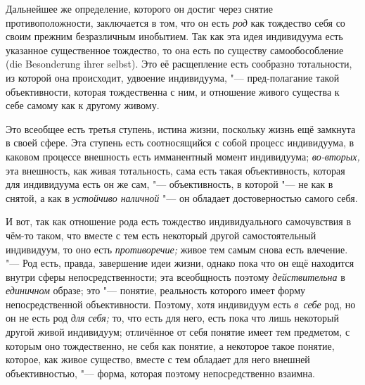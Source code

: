 Дальнейшее же определение, которого он достиг через снятие
противоположности, заключается в том, что он есть
{\em род} как тождество
себя со своим прежним безразличным инобытием. Так как эта
идея индивидуума есть указанное существенное тождество, то она есть по
существу самообособление (die Besonderung ihrer selbst). Это
её расщепление есть сообразно тотальности, из которой она происходит,
удвоение индивидуума, "--- пред-полагание такой объективности,
которая тождественна с ним, и отношение живого существа к себе самому как к
другому живому.

Это всеобщее есть третья ступень, истина жизни, поскольку
жизнь ещё замкнута в своей сфере. Эта ступень есть соотносящийся с собой
процесс индивидуума, в каковом процессе внешность есть имманентный момент
индивидуума; {\em во-вторых,}
эта внешность, как живая тотальность, сама есть такая
объективность, которая для индивидуума есть он же сам, "---
объективность, в которой "--- не как в снятой, а
как в {\em устойчиво наличной}
"--- он обладает достоверностью самого себя.

И вот, так как отношение рода есть тождество индивидуального
самочувствия в чём-то таком, что вместе с тем есть некоторый другой
самостоятельный индивидуум, то оно есть {\em противоречие;} живое
тем самым снова есть влечение. "--- Род есть, правда,
завершение идеи жизни, однако пока что он ещё находится внутри сферы
непосредственности; эта всеобщность поэтому
{\em действительна} в {\em единичном} образе;
это "--- понятие, реальность которого имеет форму
непосредственной объективности. Поэтому, хотя индивидуум есть
{\em в~себе} род, но он не есть род {\em для себя;}
то, что есть для него, есть пока что лишь некоторый другой
живой индивидуум; отличённое от себя понятие имеет тем предметом, с которым
оно тождественно, не себя как понятие, а некоторое такое понятие, которое,
как живое существо, вместе с тем обладает для него внешней объективностью,
"--- форма, которая поэтому непосредственно взаимна.

